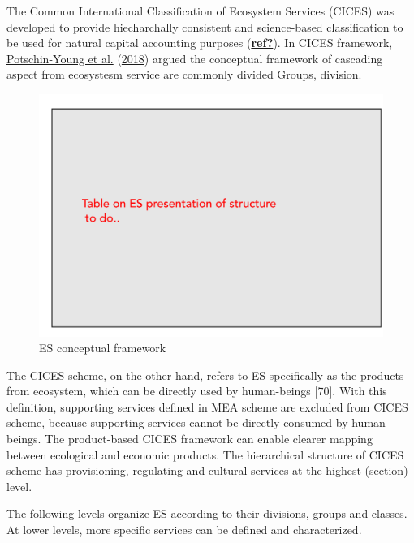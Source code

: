 \documentclass[]{elsarticle} %
\begin{document}
The Common International Classification of Ecosystem Services (CICES) was developed to provide hiecharchally consistent and science-based classification to be used for natural capital accounting purposes (\protect\hyperlink{ref-ref}{\textbf{ref?}}).
In CICES framework, \protect\hyperlink{ref-Potschin-Young2018}{Potschin-Young et al.} (\protect\hyperlink{ref-Potschin-Young2018}{2018}) argued the conceptual framework of cascading aspect from ecosystesm service are commonly divided Groups, division.

\begin{figure}[!ht]

{\centering \includegraphics[width=1\linewidth]{Figures/cices} 

}

\caption{ES conceptual framework}\label{fig:Fig-ES-cices}
\end{figure}

The CICES scheme, on the other hand, refers to ES specifically as the products from ecosystem, which can be directly used by human-beings {[}70{]}.
With this definition, supporting services defined in MEA scheme are excluded from CICES scheme, because supporting services cannot be directly consumed by human beings.
The product-based CICES framework can enable clearer mapping between ecological and economic products.
The hierarchical structure of CICES scheme has provisioning, regulating and cultural services at the highest (section) level.

The following levels organize ES according to their divisions, groups and classes.
At lower levels, more specific services can be defined and characterized.
\end{document}
